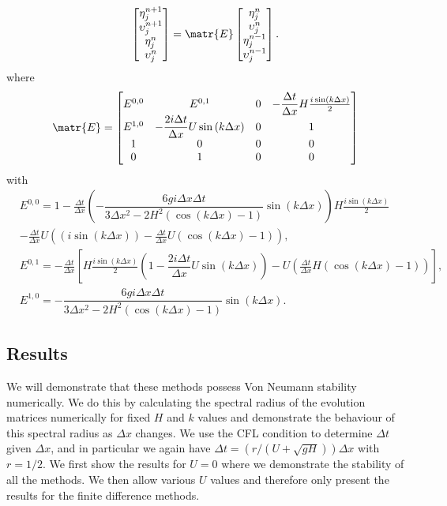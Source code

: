 \begin{equation}
\begin{bmatrix}
\eta^{n+1}_j \\
\upsilon^{n+1}_j\\
\eta^n_j \\
\upsilon^n_j
\end{bmatrix}= \matr{E}  \begin{bmatrix}
\eta^{n}_j \\
\upsilon^{n}_j\\
\eta^{n-1}_j \\
\upsilon^{n-1}_j
\end{bmatrix}.
\end{equation}
where
\begin{equation}
\matr{E} = \begin{bmatrix}
{E}^{0,0} & {E}^{0,1} & 0 & - \dfrac{\Delta t}{\Delta x}H\frac{i\sin\left(k\Delta x\right)}{2} \\
{E}^{1,0} & -\dfrac{2i \Delta t }{\Delta x} U \sin\left(k \Delta x\right)&0 & 1 \\
1&0&0&0\\
0&1&0&0
\end{bmatrix}
\end{equation}
with
\begin{align*}
&{E}^{0,0} = 1 - \frac{\Delta t}{\Delta x}\left(-\dfrac{6 gi \Delta x\Delta t}{3 \Delta x^2 -2{H^2} \left( \cos\left(k \Delta x\right) - 1 \right)}{ \sin\left(k \Delta x\right)}\right)H\frac{i\sin\left(k\Delta x\right)}{2} \\ &- \frac{\Delta t}{\Delta x}U\left(\left(i\sin\left(k\Delta x\right)\right) - \frac{\Delta t}{\Delta x}U\left(\cos\left(k\Delta x\right) - 1\right)\right), \\
&{E}^{0,1} = - \frac{\Delta t}{\Delta x} \left[H\frac{i\sin\left(k\Delta x\right)}{2}\left( 1 -\dfrac{2i \Delta t }{\Delta x} U \sin\left(k \Delta x\right) \right)   -U\left(\frac{\Delta t}{\Delta x}H\left(\cos\left(k\Delta x\right) - 1\right)\right) \right],\\
& {E}^{1,0} =-\dfrac{6 gi \Delta x\Delta t}{3 \Delta x^2 -2{H^2} \left( \cos\left(k \Delta x\right) - 1 \right)}{ \sin\left(k \Delta x\right)}.
\end{align*}


\subsection{Results}
\label{subsec:VonNStabRes}
We will demonstrate that these methods possess Von Neumann stability numerically. We do this by calculating the spectral radius of the evolution matrices numerically for fixed $H$ and $k$ values and demonstrate the behaviour of this spectral radius as $\Delta x$ changes. We use the CFL condition to determine $\Delta t$ given $\Delta x$, and in particular we again have $\Delta t =   \left( r / \left(U + \sqrt{gH}\right) \right) {\Delta x} $ with $r= 1/2$. We first show the results for $U = 0$ where we demonstrate the stability of all the methods. We then allow various $U$ values and therefore only present the results for the finite difference methods.

